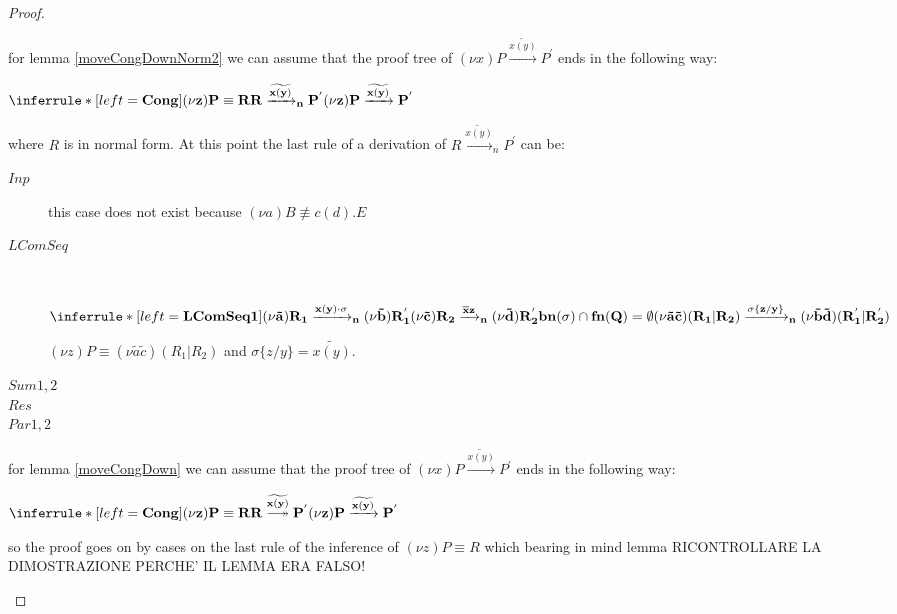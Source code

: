 \begin{proposition}
\begin{proof}
\begin{description}
	    for lemma \ref{moveCongDownNorm2} we can assume that the proof tree of $(\nu x)P \xrightarrow{\widetilde{x(y)}} P^{'}$ ends in the following way:
	    \begin{center}
	      $\inferrule* [left=\bf{Cong}]{
		  (\nu z)P \equiv R
		\\
		  R \xrightarrow{\widetilde{x(y)}}_{n} P^{'}
	      }{
		(\nu z)P \xrightarrow{\widetilde{x(y)}} P^{'}
	      }$
	    \end{center}
	    where $R$ is in normal form. At this point the last rule of a derivation of $R \xrightarrow{\widetilde{x(y)}}_{n} P^{'}$ can be: 
	    \begin{description}	
	      \item[$Inp$] 
		this case does not exist because $(\nu a)B \not \equiv c(d).E$
	      \item[$LComSeq$]\hfill \\
		\begin{center}
		  $\inferrule* [left=\bf{LComSeq1}]{
			  (\nu \tilde{a})R_{1} \xrightarrow{x(y)\cdot \sigma}_{n} (\nu \tilde{b})R_{1}^{'}
			\\
			  (\nu \tilde{c})R_{2} \xrightarrow{\overline{x}z}_{n} (\nu \tilde{d})R_{2}^{'}
			\\
			  bn(\sigma)\cap fn(Q) = \emptyset
		      }{
			(\nu \tilde{a} \tilde{c}) (R_{1}|R_{2}) \xrightarrow{\sigma\{z/y\}}_{n} (\nu \tilde{b} \tilde{d})(R_{1}^{'}|R_{2}^{'})
		      }$
		\end{center}
		$(\nu z)P \equiv (\nu \tilde{a} \tilde{c}) (R_{1}|R_{2})$ and $\sigma\{z/y\}=\widetilde{x(y)}$.
	      \item[$Sum1,2$]
	      \item[$Res$]
	      \item[$Par1,2$]
	    \end{description}
	  \item[$Cong$ $\twoheadrightarrow$]
	    for lemma \ref{moveCongDown} we can assume that the proof tree of $(\nu x)P \xrightarrow{\widetilde{x(y)}} P^{'}$ ends in the following way:
	    \begin{center}
	      $\inferrule* [left=\bf{Cong}]{
		  (\nu z)P \equiv R
		\\
		  R \stackrel{\widetilde{x(y)}}{\longtwoheadrightarrow} P^{'}
	      }{
		(\nu z)P \xrightarrow{\widetilde{x(y)}} P^{'}
	      }$
	    \end{center}
	    so the proof goes on by cases on the last rule of the inference of $(\nu z)P \equiv R$ which bearing in mind lemma 
	    RICONTROLLARE LA DIMOSTRAZIONE PERCHE' IL LEMMA ERA FALSO!

\end{description}
\end{proof}
\end{proposition}
